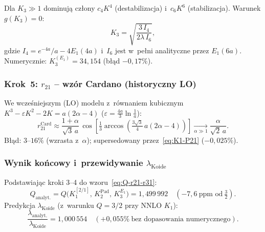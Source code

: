Dla $K_3\gg1$ dominuj\k{a} cz\l{}ony $c_4 K^4$ (destabilizacja) i~$c_6 K^6$
(stabilizacja). Warunek $g(K_3)=0$:
\begin{equation}\label{eq:K3-Ei}
\boxed{
  K_3 = \sqrt{\frac{3\,I_4}{2\lambda\,I_6}},
}
\end{equation}
gdzie $I_4=e^{-4a}/a-4E_1(4a)$ i~$I_6$ jest w~pe\l{}ni analityczne
przez $E_1(6a)$.
Numerycznie: $K_3^{(E_1)}=34{,}154$ (b\l{}\k{a}d $-0{,}17\%$).

\subsubsection{Krok~5: $r_{21}$ -- wzór Cardano (historyczny LO)}%
\label{app:F-cardano}

We wcze\'sniejszym (LO) modelu z~r\'ownaniem kubicznym
$K^3-\varepsilon K^2-2K=a(2\alpha-4)$
($\varepsilon=\frac{4a}{3}\ln\frac{1}{a}$):
\begin{equation}\label{eq:r21-Cardano}
  r_{21}^\mathrm{Card}
  \approx
  \frac{1+\alpha}{\sqrt{3}\,a}\,
  \cos\!\left[\tfrac{1}{3}\arccos\!\!\left(\tfrac{3\sqrt{3}}{4}\,a(2\alpha-4)\right)\right]
  \xrightarrow[\alpha\gg1]{} \frac{\alpha}{\sqrt{2}\,a}.
\end{equation}
B\l{}\k{a}d: $3$--$16\%$ (wzrasta z~$\alpha$);
supersedowany przez~\eqref{eq:K1-P21} ($-0{,}025\%$).

\subsubsection{Wynik ko\'ncowy i~przewidywanie $\lambda_\mathrm{Koide}$}%
\label{app:F-Q-final}

Podstawiaj\k{a}c kroki 3--4 do wzoru~\eqref{eq:Q-r21-r31}:
\begin{equation}\label{eq:Q-analytic-final}
  Q_\mathrm{analyt.}
  = Q\bigl(K_1^{[2/1]},\,K_2^\mathrm{Pad},\,K_3^{E_1}\bigr)
  = 1{,}499\,992
  \quad(-7{,}6\ \text{ppm od}\ \tfrac{3}{2}).
\end{equation}
Predykcja $\lambda_\mathrm{Koide}$ (z~warunku $Q=3/2$ przy NNLO $K_1$):
\begin{equation}\label{eq:lam-pred}
  \frac{\lambda_\mathrm{analyt.}}{\lambda_\mathrm{Koide}}
  = 1{,}000\,554
  \quad(+0{,}055\%\ \text{bez dopasowania numerycznego}).
\end{equation}

